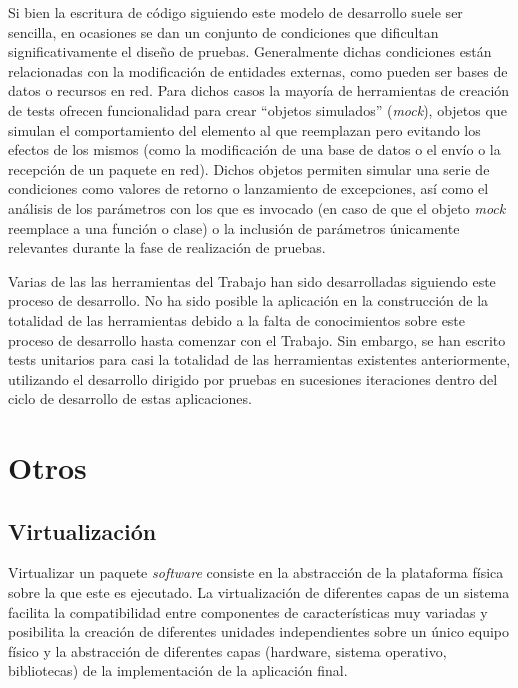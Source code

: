 Si bien la escritura de código siguiendo este modelo de desarrollo suele ser sencilla, en ocasiones se dan un conjunto de condiciones que dificultan significativamente el diseño de pruebas. Generalmente dichas condiciones están relacionadas con la modificación de entidades externas, como pueden ser bases de datos o recursos en red. Para dichos casos la mayoría de herramientas de creación de tests ofrecen funcionalidad para crear ``objetos simulados'' (\textit{mock}), objetos que simulan el comportamiento del elemento al que reemplazan pero evitando los efectos de los mismos (como la modificación de una base de datos o el envío o la recepción de un paquete en red). Dichos objetos permiten simular una serie de condiciones como valores de retorno o lanzamiento de excepciones, así como el análisis de los parámetros con los que es invocado (en caso de que el objeto \textit{mock} reemplace a una función o clase) o la inclusión de parámetros únicamente relevantes durante la fase de realización de pruebas.


Varias de las las herramientas del Trabajo han sido desarrolladas siguiendo este proceso de desarrollo. No ha sido posible la aplicación en la construcción de la totalidad de las herramientas debido a la falta de conocimientos sobre este proceso de desarrollo hasta comenzar con el Trabajo. Sin embargo, se han escrito tests unitarios para casi la totalidad de las herramientas existentes anteriormente, utilizando el desarrollo dirigido por pruebas en sucesiones iteraciones dentro del ciclo de desarrollo de estas aplicaciones.


\section{Otros}

\subsection{Virtualización}
\label{teoria:virtualizacion}

Virtualizar un paquete \textit{software} consiste en la abstracción de la plataforma física sobre la que este es ejecutado. La virtualización de diferentes capas de un sistema facilita la compatibilidad entre componentes de características muy variadas y posibilita la creación de diferentes unidades independientes sobre un único equipo físico y la abstracción de diferentes capas (hardware, sistema operativo, bibliotecas) de la implementación de la aplicación final.

